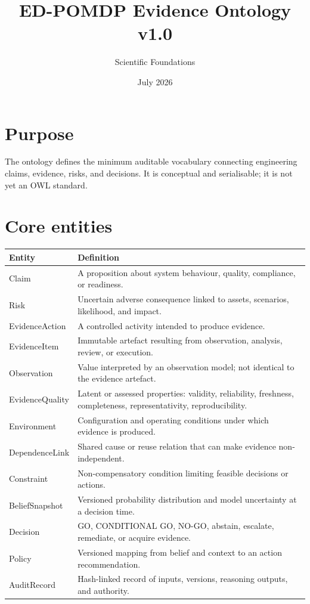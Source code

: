 \documentclass[11pt]{article}
\title{ED-POMDP Evidence Ontology v1.0}
\author{Scientific Foundations}
\date{July 2026}
\begin{document}
\maketitle
\section{Purpose}
The ontology defines the minimum auditable vocabulary connecting engineering claims, evidence, risks, and decisions. It is conceptual and serialisable; it is not yet an OWL standard.
\section{Core entities}
\begin{longtable}{p{}p{}}
\toprule Entity & Definition\\\midrule
Claim & A proposition about system behaviour, quality, compliance, or readiness.\\
Risk & Uncertain adverse consequence linked to assets, scenarios, likelihood, and impact.\\
EvidenceAction & A controlled activity intended to produce evidence.\\
EvidenceItem & Immutable artefact resulting from observation, analysis, review, or execution.\\
Observation & Value interpreted by an observation model; not identical to the evidence artefact.\\
EvidenceQuality & Latent or assessed properties: validity, reliability, freshness, completeness, representativity, reproducibility.\\
Environment & Configuration and operating conditions under which evidence is produced.\\
DependenceLink & Shared cause or reuse relation that can make evidence non-independent.\\
Constraint & Non-compensatory condition limiting feasible decisions or actions.\\
BeliefSnapshot & Versioned probability distribution and model uncertainty at a decision time.\\
Decision & GO, CONDITIONAL GO, NO-GO, abstain, escalate, remediate, or acquire evidence.\\
Policy & Versioned mapping from belief and context to an action recommendation.\\
AuditRecord & Hash-linked record of inputs, versions, reasoning outputs, and authority.\\\bottomrule
\end{longtable}
\end{document}
